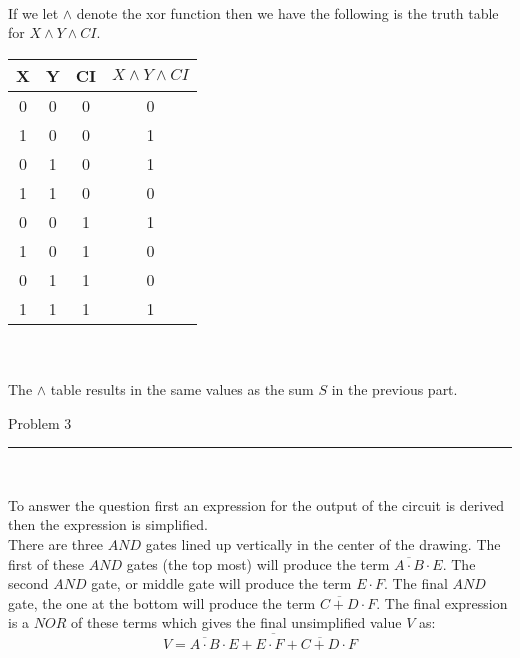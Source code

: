 \documentclass[11pt,reqno]{article}
\begin{document}
\noindent{}\\ 

\noindent If we let $\land$ denote the xor function then we have the following is the truth table for $X \land Y \land CI$.\\

\begin{tabular}{| c | c | c | c |}
\hline
X & Y & CI & $X \land Y \land CI$ \\ \hline
0 & 0 & 0 & 0 \\ \hline
1 & 0 & 0 & 1 \\ \hline
0 & 1 & 0 & 1 \\ \hline
1 & 1 & 0 & 0 \\ \hline
0 & 0 & 1 & 1 \\ \hline
1 & 0 & 1 & 0 \\ \hline
0 & 1 & 1 & 0 \\ \hline
1 & 1 & 1 & 1 \\ \hline
\end{tabular}\\ \\

\noindent The $\land$ table results in the same values as the sum $S$ in the previous part.
\newpage

\begin{flushleft} 
Problem 3 \\
\rule{500pt}{1pt}\\
\end{flushleft} 

To answer the question first an expression for the output of the circuit is derived then the expression is simplified.\\
There are three $AND$ gates lined up vertically in the center of the drawing. The first of these $AND$ gates (the top most) will produce the term $\overline{A \cdot B} \cdot E$. The second $AND$ gate, or middle gate will produce the term $E \cdot F$. The final $AND$ gate, the one at the bottom will produce the term $\overline{C + D} \cdot F$. The final expression is a $NOR$ of these terms which gives the final unsimplified value $V$ as:
\[ V = \overline{ \overline{A \cdot B} \cdot E + E \cdot F + \overline{C + D} \cdot F } \]
\end{document}
